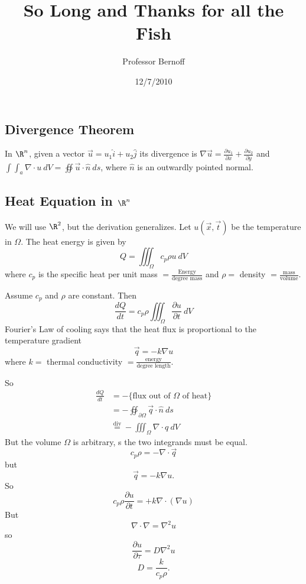 \documentclass{article}
\title{So Long and Thanks for all the Fish}
\author{Professor Bernoff}
\date{12/7/2010}
\newcommand{\x}{\vec{x}}
\renewcommand{\u}{\vec{u}}
\newcommand{\nhat}{\hat{n}}
\newcommand{\q}{\vec{q}}
\newcommand{\ihat}{\hat{i}}
\newcommand{\jhat}{\hat{j}}
\renewcommand{\t}{\vec{t}}
\begin{document}
\maketitle
\subsection{Divergence Theorem}
In $\R^n$, given a vector $\u = u_1 \ihat + u_2 \jhat$ its divergence is $\nabla
\u = \frac{\partial u_1}{\partial x} + \frac{\partial u_2}{\partial y}$ and
$\int\int_a \nabla \cdot u~dV = \oiint \u \cdot \nhat ~ds$, where $\nhat$ is an
outwardly pointed normal.

\subsection{Heat Equation in $\R^n$}
We will use $\R^2$, but the derivation generalizes. Let $u(\x, \t)$ be the
temperature in $\Omega$. The heat energy is given by
\[ Q = \iiint_{\Omega} c_p \rho u~dV\]
where $c_p$ is the specific heat per unit mass $ =
\frac{\text{Energy}}{\text{degree mass}}$ and $\rho = $ density $ =
\frac{\text{mass}}{\text{volume}}$.

Assume $c_p$ and $\rho$ are constant. Then
\[ \frac{dQ}{dt} = c_p \rho \iiint_{\Omega} \frac{\partial u}{\partial t}~dV\]
Fourier's Law of cooling says that the heat flux is proportional to the
temperature gradient
\[ \q = -k \nabla u\]
where $k = $ thermal conductivity $ = \frac{\text{energy}}{\text{degree
length}}.$

So
\begin{align*}
\frac{dQ}{dt} &= - \{ \text{flux out of $\Omega$ of heat} \} \\
        &= - \oiint_{\partial \Omega} \q \cdot \nhat ~ds \\
        &\stackrel{\text{div}}{=} - \iiint_{\Omega} \nabla \cdot q~dV
\end{align*}
But the volume $\Omega$ is arbitrary, s the two integrands must be equal.
\[c_p \rho = - \nabla \cdot \q\]
but
\[ \q = - k \nabla u.\]
So
\[c_p \rho \frac{\partial u}{\partial t} = + k \nabla \cdot ( \nabla u)\]
But
\[ \nabla \cdot \nabla = \nabla^2 u\]
so
\[\frac{\partial u}{\partial \tau} = D \nabla^2 u\]
\[D = \frac{k}{c_p\rho}.\]
\end{document}
